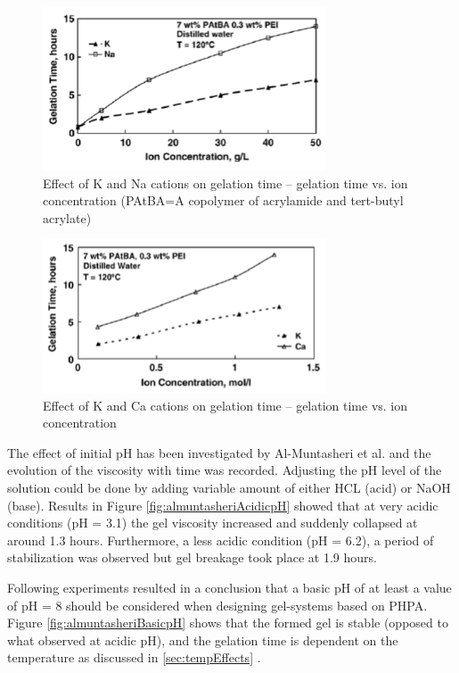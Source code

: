 \begin{figure}
    \centering
    \includegraphics[width=0.75\textwidth]{img/fig/almuntasheriKNa.png}
    \caption{Effect of K and Na cations on gelation time – gelation time vs. ion concentration (PAtBA=A copolymer of acrylamide and tert-butyl acrylate) \citep{Al-Muntasheri2007}}
    \label{fig:almuntasheriKNa} %
\end{figure}

\begin{figure}
    \centering
    \includegraphics[width=0.75\textwidth]{img/fig/almuntasheriKCa.png}
    \caption{Effect of K and Ca cations on gelation time – gelation time vs. ion concentration \citep{Al-Muntasheri2007}}
    \label{fig:almuntasheriKCa} %
\end{figure}

The effect of initial pH has been investigated by Al-Muntasheri et al. and the evolution of the viscosity with time was recorded. Adjusting the pH level of the solution could be done by adding variable amount of either HCL (acid) or NaOH (base). Results in Figure \ref{fig:almuntasheriAcidicpH} showed that at very acidic conditions (pH = 3.1) the gel viscosity increased and suddenly collapsed at around 1.3 hours. Furthermore, a less acidic condition (pH = 6.2), a period of stabilization was observed but gel breakage took place at 1.9 hours. 

Following experiments resulted in a conclusion that a basic pH of at least a value of pH = 8 should be considered when designing gel-systems based on PHPA. Figure \ref{fig:almuntasheriBasicpH} shows that the formed gel is stable (opposed to what observed at acidic pH), and the gelation time is dependent on the temperature as discussed in \ref{sec:tempEffects} \citep{Al-Muntasheri2007}.

